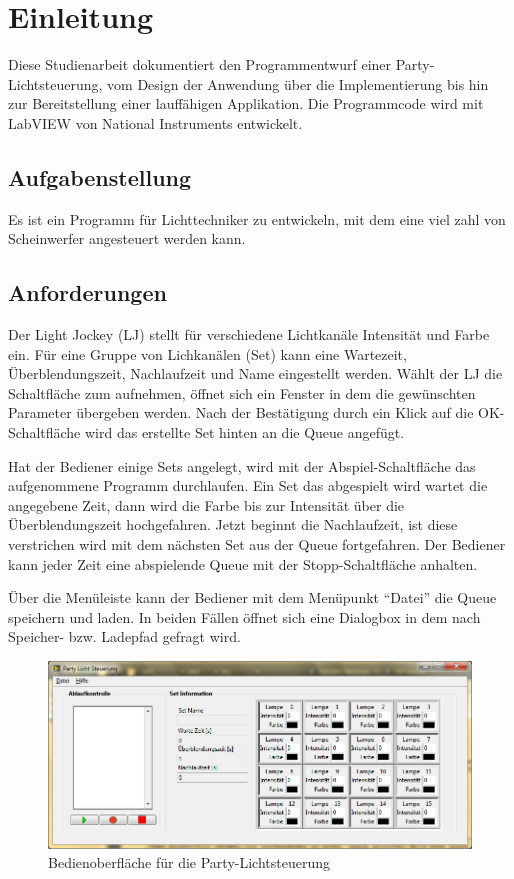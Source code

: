 \section{Einleitung}%

Diese Studienarbeit dokumentiert den Programmentwurf einer Party-Lichtsteuerung, vom Design der Anwendung über die Implementierung bis hin zur Bereitstellung einer lauffähigen Applikation.
Die Programmcode wird mit LabVIEW von National Instruments entwickelt.

\subsection{Aufgabenstellung}
Es ist ein Programm für Lichttechniker zu entwickeln, mit dem eine viel zahl von Scheinwerfer angesteuert werden kann. 

\subsection{Anforderungen}
Der Light Jockey (LJ) stellt für verschiedene Lichtkanäle Intensität und Farbe ein. Für eine Gruppe von Lichkanälen (Set) kann eine Wartezeit, Überblendungszeit, Nachlaufzeit und Name eingestellt werden. Wählt der LJ die Schaltfläche zum aufnehmen, öffnet sich ein Fenster in dem die gewünschten Parameter übergeben werden. Nach der Bestätigung durch ein Klick auf die OK-Schaltfläche wird das erstellte Set hinten an die Queue angefügt.

Hat der Bediener einige Sets angelegt, wird mit der Abspiel-Schaltfläche das aufgenommene Programm durchlaufen. Ein Set das abgespielt wird wartet die angegebene Zeit, dann wird die Farbe bis zur Intensität über die Überblendungszeit hochgefahren. Jetzt beginnt die Nachlaufzeit, ist diese verstrichen wird mit dem nächsten Set aus der Queue fortgefahren. Der Bediener kann jeder Zeit eine abspielende Queue mit der Stopp-Schaltfläche anhalten.

Über die Menüleiste kann der Bediener mit dem Menüpunkt "`Datei"' die Queue speichern und laden. In beiden Fällen öffnet sich eine Dialogbox in dem nach Speicher- bzw. Ladepfad gefragt wird.

	\begin{figure}%
	\centering
		\includegraphics[width=\textwidth]{Pics/Oberflaeche001.png}
	\caption{Bedienoberfläche für die Party-Lichtsteuerung}
	\label{fig:ober001}
	\end{figure}



